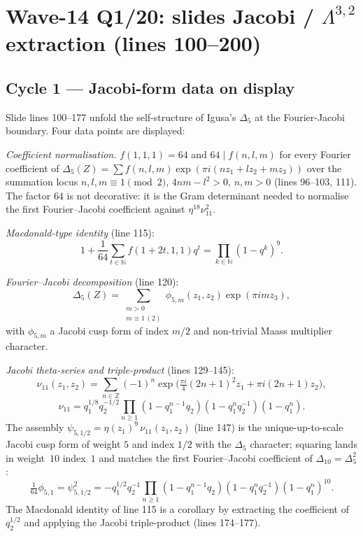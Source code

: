 
\providecommand{\kBKM}{\kappa_{\mathrm{BKM}}}
\providecommand{\kch}{\kappa_{\mathrm{ch}}}
\providecommand{\Sp}{\mathrm{Sp}}
\providecommand{\GL}{\mathrm{GL}}
\providecommand{\SL}{\mathrm{SL}}
\providecommand{\SO}{\mathrm{SO}}
\providecommand{\Orth}{\mathrm{O}}
\providecommand{\HH}{\mathbb{H}}
\providecommand{\Zd}{\mathbb{Z}}
\providecommand{\Cd}{\mathbb{C}}

\section*{Wave-14 Q1/20: slides Jacobi / $\Lambda^{3,2}$ extraction (lines 100--200)}

\subsection*{Cycle 1 --- Jacobi-form data on display}

Slide lines 100--177 unfold the self-structure of Igusa's $\Delta_5$ at
the Fourier-Jacobi boundary. Four data points are displayed:

\emph{Coefficient normalisation.} $f(1,1,1)=64$ and $64\mid f(n,l,m)$
for every Fourier coefficient of $\Delta_5(Z)=\sum f(n,l,m)
\exp(\pi i(nz_1+lz_2+mz_3))$ over the summation locus $n,l,m\equiv 1
\pmod{2}$, $4nm-l^2>0$, $n,m>0$ (lines 96--103, 111). The factor $64$ is
not decorative: it is the Gram determinant needed to normalise the
first Fourier--Jacobi coefficient against $\eta^{18}\nu_{11}^2$.

\emph{Macdonald-type identity} (line 115):
\[
1+\frac{1}{64}\sum_{t\in\mathbb{N}}f(1+2t,1,1)q^t
=\prod_{k\in\mathbb{N}}(1-q^k)^9.
\]

\emph{Fourier--Jacobi decomposition} (line 120):
\[
\Delta_5(Z)=\sum_{\substack{m>0\\m\equiv 1\,(2)}}
\phi_{5,m}(z_1,z_2)\exp(\pi i m z_3),
\]
with $\phi_{5,m}$ a Jacobi cusp form of index $m/2$ and non-trivial
Maass multiplier character.

\emph{Jacobi theta-series and triple-product} (lines 129--145):
\[
\nu_{11}(z_1,z_2)=\sum_{n\in\mathbb{Z}}(-1)^n
\exp\bigl(\tfrac{\pi i}{4}(2n+1)^2 z_1+\pi i(2n+1)z_2\bigr),
\]
\[
\nu_{11}=q_1^{1/8}q_2^{-1/2}\prod_{n\geq 1}
(1-q_1^{n-1}q_2)(1-q_1^n q_2^{-1})(1-q_1^n).
\]
The assembly $\psi_{5,1/2}=\eta(z_1)^9\,\nu_{11}(z_1,z_2)$ (line 147) is
the unique-up-to-scale Jacobi cusp form of weight $5$ and index $1/2$
with the $\Delta_5$ character; squaring lands in weight~$10$ index~$1$
and matches the first Fourier--Jacobi coefficient of $\Delta_{10}=
\Delta_5^2$:
\[
\tfrac{1}{64}\phi_{5,1}=\psi_{5,1/2}^2
=-q_1^{1/2}q_2^{-1}\prod_{n\geq 1}(1-q_1^{n-1}q_2)(1-q_1^n q_2^{-1})
(1-q_1^n)^{10}.
\]
The Macdonald identity of line 115 is a corollary by extracting the
coefficient of $q_2^{1/2}$ and applying the Jacobi triple-product
(lines 174--177).

